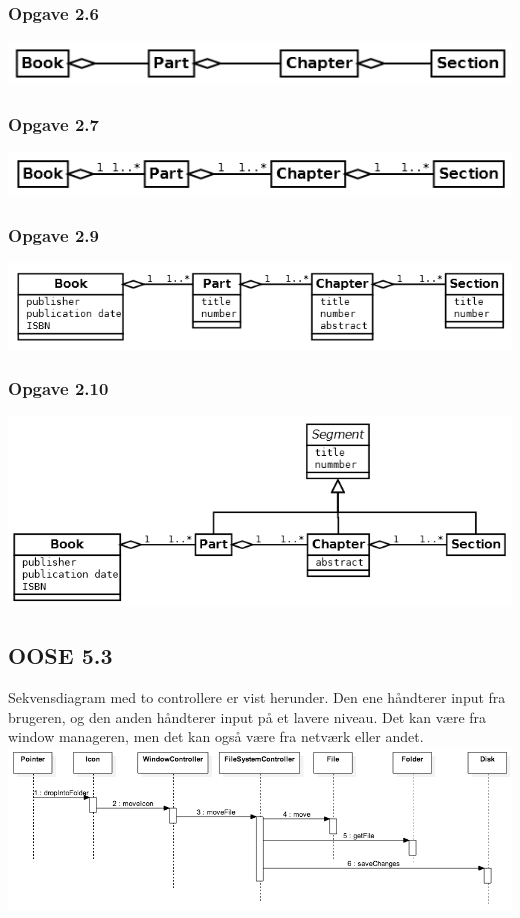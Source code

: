 \documentclass[12pt]{article}
\begin{document}
\subsubsection*{Opgave 2.6}
\includegraphics[scale=0.8]{diagrammer/E2_6} \\
\subsubsection*{Opgave 2.7}
\includegraphics[scale=0.8]{diagrammer/E2_7} \\
\subsubsection*{Opgave 2.9}
\includegraphics[scale=0.8]{diagrammer/E2_9} \\
\subsubsection*{Opgave 2.10}
\includegraphics[scale=0.8]{diagrammer/E2_10} \\
\subsection{OOSE 5.3}
Sekvensdiagram med to controllere er vist herunder. Den ene håndterer input fra brugeren, og den anden håndterer input på et lavere niveau. Det kan være fra window manageren, men det kan også være fra netværk eller andet. \\
\includegraphics[width=1.0\textwidth]{diagrammer/SD.png}
\end{document}

